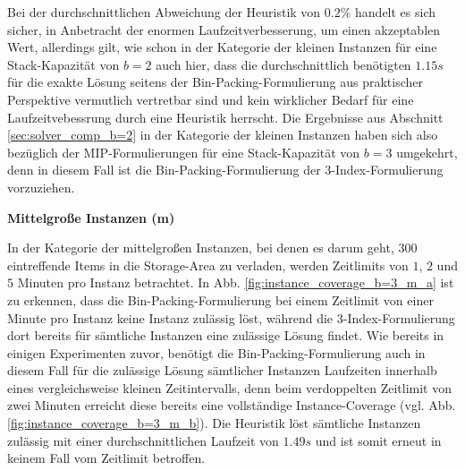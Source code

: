 Bei der durchschnittlichen Abweichung der Heuristik von $0.2 \%$ handelt es sich sicher, in Anbetracht
der enormen Laufzeitverbesserung, um einen akzeptablen Wert, allerdings gilt, wie schon in der Kategorie
der kleinen Instanzen für eine Stack-Kapazität von $b = 2$ auch hier, dass die durchschnittlich benötigten $1.15s$
für die exakte Lösung seitens der Bin-Packing-Formulierung aus praktischer Perspektive vermutlich vertretbar sind
und kein wirklicher Bedarf für eine Laufzeitvebessrung durch eine Heuristik herrscht.
Die Ergebnisse aus Abschnitt \ref{sec:solver_comp_b=2} in der Kategorie der kleinen
Instanzen haben sich also bezüglich der MIP-Formulierungen für eine Stack-Kapazität von $b = 3$ umgekehrt, denn in diesem Fall ist die Bin-Packing-Formulierung der 3-Index-Formulierung vorzuziehen.

\vfill
\pagebreak

\textbf{Mittelgroße Instanzen (m)}

In der Kategorie der mittelgroßen Instanzen, bei denen es darum geht, $300$ eintreffende Items in die Storage-Area
zu verladen, werden Zeitlimits von $1$, $2$ und $5$ Minuten pro Instanz betrachtet.
In Abb. \ref{fig:instance_coverage_b=3_m_a} ist zu erkennen, dass die Bin-Packing-Formulierung bei einem Zeitlimit von einer Minute pro Instanz keine Instanz zulässig löst, während die 3-Index-Formulierung dort bereits für sämtliche Instanzen eine zulässige Lösung findet. Wie bereits in einigen Experimenten zuvor, benötigt die Bin-Packing-Formulierung
auch in diesem Fall für die zulässige Lösung sämtlicher Instanzen Laufzeiten innerhalb eines vergleichsweise kleinen Zeitintervalls, denn beim verdoppelten Zeitlimit von zwei Minuten erreicht diese bereits eine vollständige Instance-Coverage (vgl. Abb. \ref{fig:instance_coverage_b=3_m_b}).
Die Heuristik löst sämtliche Instanzen zulässig mit einer durchschnittlichen Laufzeit von $1.49s$ und ist somit erneut
in keinem Fall vom Zeitlimit betroffen.


